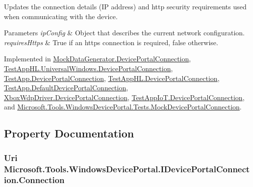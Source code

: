 Updates the connection details (IP address) and http security requirements used when communicating with the device. 


\begin{DoxyParams}{Parameters}
{\em ip\+Config} & Object that describes the current network configuration.\\
\hline
{\em requires\+Https} & True if an https connection is required, false otherwise.\\
\hline
\end{DoxyParams}


Implemented in \hyperlink{class_mock_data_generator_1_1_device_portal_connection_a0f45f562b4e19e2d28c4f844bca52a90}{Mock\+Data\+Generator.\+Device\+Portal\+Connection}, \hyperlink{class_test_app_h_l_1_1_universal_windows_1_1_device_portal_connection_ab60a740953027435f5584a18bb73e057}{Test\+App\+H\+L.\+Universal\+Windows.\+Device\+Portal\+Connection}, \hyperlink{class_test_app_1_1_device_portal_connection_a3abb3edbff491de3e1035e60eaf75ea5}{Test\+App.\+Device\+Portal\+Connection}, \hyperlink{class_test_app_h_l_1_1_device_portal_connection_af47760d39f76cfb34165e4aeada32ba6}{Test\+App\+H\+L.\+Device\+Portal\+Connection}, \hyperlink{class_test_app_1_1_default_device_portal_connection_adc9d5c4cddd75df5200edf95d1c27aff}{Test\+App.\+Default\+Device\+Portal\+Connection}, \hyperlink{class_xbox_wdp_driver_1_1_device_portal_connection_a77dc3f998c35b885d1fc7a6fc843db03}{Xbox\+Wdp\+Driver.\+Device\+Portal\+Connection}, \hyperlink{class_test_app_io_t_1_1_device_portal_connection_a02a381f37cdbaac547f895e1da9ec87b}{Test\+App\+Io\+T.\+Device\+Portal\+Connection}, and \hyperlink{class_microsoft_1_1_tools_1_1_windows_device_portal_1_1_tests_1_1_mock_device_portal_connection_a5fdffbca0acde9a3bb387688f80f0d64}{Microsoft.\+Tools.\+Windows\+Device\+Portal.\+Tests.\+Mock\+Device\+Portal\+Connection}.



\subsection{Property Documentation}
\subsubsection[{\texorpdfstring{Connection}{Connection}}]{\setlength{\rightskip}{0pt plus 5cm}Uri Microsoft.\+Tools.\+Windows\+Device\+Portal.\+I\+Device\+Portal\+Connection.\+Connection\hspace{0.3cm}{\ttfamily [get]}}\hypertarget{interface_microsoft_1_1_tools_1_1_windows_device_portal_1_1_i_device_portal_connection_a555066dca787a09572a26c635baf0ccc}{}\label{interface_microsoft_1_1_tools_1_1_windows_device_portal_1_1_i_device_portal_connection_a555066dca787a09572a26c635baf0ccc}


